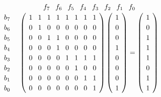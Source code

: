 \documentclass[12pt, oneside]{article}
\begin{document}
\begin{equation}
\renewcommand{\arraystretch}{1.2}
\setlength{\arraycolsep}{4pt}
\begin{array}{c@{\hskip 10pt}c}
& \begin{array}{cccccccc}
    f_7 & f_6 & f_5 & f_4 & f_3 & f_2 & f_1 & f_0
  \end{array}
\\[0.1em]
\begin{array}{c}
  b_7 \\
  b_6 \\
  b_5 \\
  b_4 \\
  b_3 \\
  b_2 \\
  b_1 \\
  b_0 \\
\end{array}
&
\left(
\begin{array}{cccccccc}
1 & 1 & 1 & 1 & 1 & 1 & 1 & 1 \\
0 & 1 & 0 & 0 & 0 & 0 & 0 & 0 \\
0 & 0 & 1 & 1 & 0 & 0 & 0 & 0 \\
0 & 0 & 0 & 1 & 0 & 0 & 0 & 0 \\
0 & 0 & 0 & 0 & 1 & 1 & 1 & 1 \\
0 & 0 & 0 & 0 & 0 & 1 & 0 & 0 \\
0 & 0 & 0 & 0 & 0 & 0 & 1 & 1 \\
0 & 0 & 0 & 0 & 0 & 0 & 0 & 1 \\
\end{array}
\right)
\left(
\begin{array}{c}
1 \\
0 \\
0 \\
1 \\
0 \\
0 \\
0 \\
1 \\
\end{array}
\right)
=
\left(
\begin{array}{c}
1 \\
0 \\
1 \\
1 \\
1 \\
0 \\
1 \\
1 \\
\end{array}
\right)
\end{array}
\end{equation}
\end{document}
